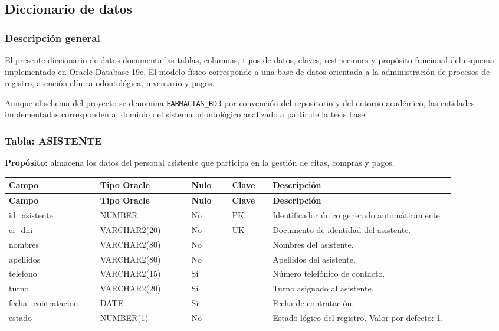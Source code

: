 \begingroup
\scriptsize
\setlength{\tabcolsep}{2.5pt}
\renewcommand{\arraystretch}{1.15}
\subsection{Diccionario de datos}

\subsubsection{Descripción general}

El presente diccionario de datos documenta las tablas, columnas, tipos de datos, claves, restricciones y propósito funcional del esquema implementado en Oracle Database 19c. El modelo físico corresponde a una base de datos orientada a la administración de procesos de registro, atención clínica odontológica, inventario y pagos.\par

Aunque el schema del proyecto se denomina \texttt{FARMACIAS\_BD3} por convención del repositorio y del entorno académico, las entidades implementadas corresponden al dominio del sistema odontológico analizado a partir de la tesis base.\par



\subsubsection{Tabla: ASISTENTE}

\textbf{Propósito:} almacena los datos del personal asistente que participa en la gestión de citas, compras y pagos.\par

\begin{longtable}{p{0.18\linewidth}p{0.18\linewidth}p{0.08\linewidth}p{0.08\linewidth}p{0.36\linewidth}}
\toprule
\textbf{Campo} & \textbf{Tipo Oracle} & \textbf{Nulo} & \textbf{Clave} & \textbf{Descripción} \\
\midrule
\endfirsthead
\toprule
\textbf{Campo} & \textbf{Tipo Oracle} & \textbf{Nulo} & \textbf{Clave} & \textbf{Descripción} \\
\midrule
\endhead
id\_asistente & NUMBER & No & PK & Identificador único generado automáticamente. \\
ci\_dni & VARCHAR2(20) & No & UK & Documento de identidad del asistente. \\
nombres & VARCHAR2(80) & No &  & Nombres del asistente. \\
apellidos & VARCHAR2(80) & No &  & Apellidos del asistente. \\
telefono & VARCHAR2(15) & Sí &  & Número telefónico de contacto. \\
turno & VARCHAR2(20) & Sí &  & Turno asignado al asistente. \\
fecha\_contratacion & DATE & Sí &  & Fecha de contratación. \\
estado & NUMBER(1) & No &  & Estado lógico del registro. Valor por defecto: 1. \\
\bottomrule
\end{longtable}



